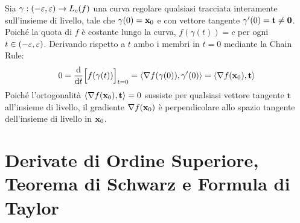 \begin{dimostrazione}
Sia $\gamma: (-\varepsilon, \varepsilon) \to L_c(f)$ una curva regolare qualsiasi tracciata interamente sull'insieme di livello, tale che $\gamma(0) = \mathbf{x}_0$ e con vettore tangente $\gamma'(0) = \mathbf{t} \neq \mathbf{0}$.
Poiché la quota di $f$ è costante lungo la curva, $f(\gamma(t)) = c$ per ogni $t \in (-\varepsilon, \varepsilon)$.
Derivando rispetto a $t$ ambo i membri in $t = 0$ mediante la Chain Rule:
\[
0 = \frac{\mathop{}\!\mathrm{d} }{\mathop{}\!\mathrm{d} t}\Big[ f(\gamma(t)) \Big]_{t=0} = \langle\nabla f(\gamma(0)), \gamma'(0)\rangle = \langle\nabla f(\mathbf{x}_0), \mathbf{t}\rangle
\]
Poiché l'ortogonalità $\langle\nabla f(\mathbf{x}_0), \mathbf{t}\rangle = 0$ sussiste per qualsiasi vettore tangente $\mathbf{t}$ all'insieme di livello, il gradiente $\nabla f(\mathbf{x}_0)$ è perpendicolare allo spazio tangente dell'insieme di livello in $\mathbf{x}_0$.
\end{dimostrazione}

\begin{center}
\end{center}

\section{Derivate di Ordine Superiore, Teorema di Schwarz e Formula di Taylor}

